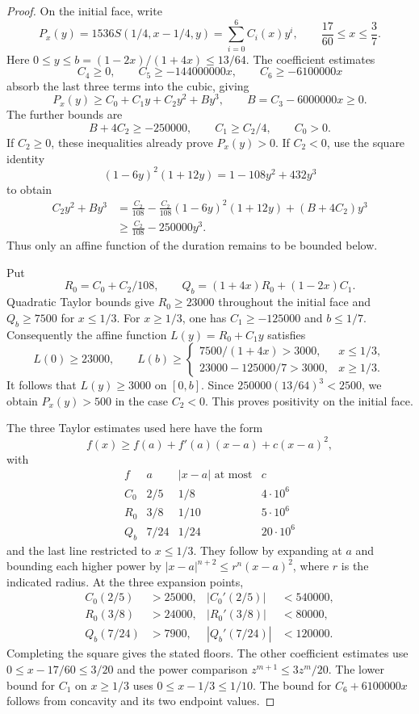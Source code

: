 \begin{proof}
On the initial face, write
\[
 P_x(y)=1536S(1/4,x-1/4,y)=\sum_{i=0}^6 C_i(x)y^i,
 \qquad \frac{17}{60}\le x\le\frac37.
\]
Here $0\le y\le b=(1-2x)/(1+4x)\le13/64$.
The coefficient estimates
\[
 C_4\ge0,\qquad C_5\ge-144000000x,\qquad C_6\ge-6100000x
\]
absorb the last three terms into the cubic, giving
\[
 P_x(y)\ge C_0+C_1y+C_2y^2+B y^3,
 \qquad B=C_3-6000000x\ge0.
\]
The further bounds are
\[
 B+4C_2\ge-250000,\qquad C_1\ge C_2/4,\qquad C_0>0.
\]
If $C_2\ge0$, these inequalities already prove $P_x(y)>0$.
If $C_2<0$, use the square identity
\[
 (1-6y)^2(1+12y)=1-108y^2+432y^3
\]
to obtain
\begin{align*}
 C_2y^2+B y^3
 &=\frac{C_2}{108}-\frac{C_2}{108}(1-6y)^2(1+12y)+(B+4C_2)y^3\\
 &\ge\frac{C_2}{108}-250000y^3.
\end{align*}
Thus only an affine function of the duration remains to be bounded below.

Put
\[
 R_0=C_0+C_2/108,\qquad
 Q_b=(1+4x)R_0+(1-2x)C_1.
\]
Quadratic Taylor bounds give $R_0\ge23000$ throughout the initial face and
$Q_b\ge7500$ for $x\le1/3$.
For $x\ge1/3$, one has $C_1\ge-125000$ and $b\le1/7$.
Consequently the affine function $L(y)=R_0+C_1y$ satisfies
\[
 L(0)\ge23000,\qquad
 L(b)\ge
 \begin{cases}
  7500/(1+4x)>3000,&x\le1/3,\\
  23000-125000/7>3000,&x\ge1/3.
 \end{cases}
\]
It follows that $L(y)\ge3000$ on $[0,b]$.
Since $250000(13/64)^3<2500$, we obtain $P_x(y)>500$ in the case $C_2<0$.
This proves positivity on the initial face.

The three Taylor estimates used here have the form
\[
 f(x)\ge f(a)+f'(a)(x-a)+c(x-a)^2,
\]
with
\[
\begin{array}{c|c|c|c}
 f&a&|x-a|\text{ at most}&c\\ \hline
 C_0&2/5&1/8&4\cdot10^6\\
 R_0&3/8&1/10&5\cdot10^6\\
 Q_b&7/24&1/24&20\cdot10^6
\end{array}
\]
and the last line restricted to $x\le1/3$.
They follow by expanding at $a$ and bounding each higher power by
$|x-a|^{n+2}\le r^n(x-a)^2$, where $r$ is the indicated radius.
At the three expansion points,
\begin{align*}
 C_0(2/5)&>25000,& |C_0'(2/5)|&<540000,\\
 R_0(3/8)&>24000,& |R_0'(3/8)|&<80000,\\
 Q_b(7/24)&>7900,& |Q_b'(7/24)|&<120000.
\end{align*}
Completing the square gives the stated floors.
The other coefficient estimates use $0\le x-17/60\le3/20$ and the power comparison
$z^{m+1}\le3z^m/20$. The lower bound for $C_1$ on $x\ge1/3$ uses
$0\le x-1/3\le1/10$. The bound for $C_6+6100000x$ follows from concavity and its two endpoint values.


\end{proof}
